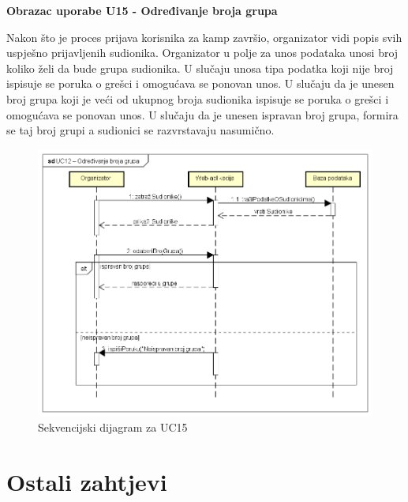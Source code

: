 \pagebreak

\textbf{Obrazac uporabe U15 - Određivanje broja grupa}

Nakon što je proces prijava korisnika za kamp završio, organizator vidi popis svih uspješno prijavljenih sudionika.
Organizator u polje za unos podataka unosi broj koliko želi
da bude grupa sudionika. U slučaju unosa tipa podatka koji nije
broj ispisuje se poruka o grešci i omogućava se ponovan unos. U slučaju da je unesen broj grupa koji je veći od ukupnog broja sudionika ispisuje se poruka o grešci i omogućava se ponovan unos. U slučaju da je unesen ispravan broj grupa, formira se taj broj grupi a sudionici se razvrstavaju nasumično.


\begin{figure}[H]
	\includegraphics[scale=0.6]{dokumentacija/dijagrami/UC12 Odredivanje broja grupa.png} %
	\centering
	\caption{Sekvencijski dijagram za UC15}
	\label{fig:promjene}
\end{figure}
\eject


\section{Ostali zahtjevi}

